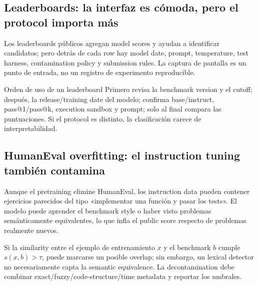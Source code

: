 
\subsection{Leaderboards: la interfaz es cómoda, pero el protocol importa más}

Los leaderboards públicos agregan model scores y ayudan a identificar candidatos; pero detrás de cada row hay model date, prompt, temperature, test harness, contamination policy y submission rules. La captura de pantalla es un punto de entrada, no un registro de experimento reproducible.


\begin{knowledgebox}{Orden de uso de un leaderboard}
Primero revisa la benchmark version y el cutoff; después, la release/training date del modelo; confirma base/instruct, pass@1/pass@k, execution sandbox y prompt; solo al final compara las puntuaciones. Si el protocol es distinto, la clasificación carece de interpretabilidad.
\end{knowledgebox}

\subsection{HumanEval overfitting: el instruction tuning también contamina}

Aunque el pretraining elimine HumanEval, los instruction data pueden contener ejercicios parecidos del tipo «implementar una función y pasar los tests». El modelo puede aprender el benchmark style o haber visto problemas semánticamente equivalentes, lo que infla el public score respecto de problemas realmente nuevos.


Si la similarity entre el ejemplo de entrenamiento $x$ y el benchmark $b$ cumple $s(x,b)>\tau$, puede marcarse un posible overlap; sin embargo, un lexical detector no necesariamente capta la semantic equivalence. La decontamination debe combinar exact/fuzzy/code-structure/time metadata y reportar los umbrales.

